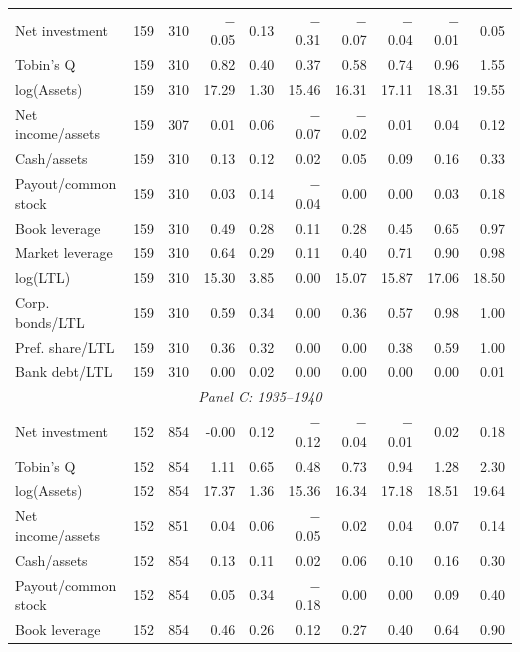 \begin{table}[p]
\begin{threeparttable}
\begin{tabular}{lrrrrrrrrr}
            \midrule
            Net investment & 159 & 310 & $-$0.05 & 0.13 & $-$0.31 & $-$0.07 & $-$0.04 & $-$0.01 & 0.05 \\
            Tobin's Q & 159 & 310 & 0.82 & 0.40 & 0.37 & 0.58 & 0.74 & 0.96 & 1.55 \\
            log(Assets) & 159 & 310 & 17.29 & 1.30 & 15.46 & 16.31 & 17.11 & 18.31 & 19.55 \\
            Net income/assets & 159 & 307 & 0.01 & 0.06 & $-$0.07 & $-$0.02 & 0.01 & 0.04 & 0.12 \\
            Cash/assets & 159 & 310 & 0.13 & 0.12 & 0.02 & 0.05 & 0.09 & 0.16 & 0.33 \\
            Payout/common stock & 159 & 310 & 0.03 & 0.14 & $-$0.04 & 0.00 & 0.00 & 0.03 & 0.18 \\
            Book leverage & 159 & 310 & 0.49 & 0.28 & 0.11 & 0.28 & 0.45 & 0.65 & 0.97 \\
            Market leverage & 159 & 310 & 0.64 & 0.29 & 0.11 & 0.40 & 0.71 & 0.90 & 0.98 \\
            log(LTL) & 159 & 310 & 15.30 & 3.85 & 0.00 & 15.07 & 15.87 & 17.06 & 18.50 \\
            Corp. bonds/LTL & 159 & 310 & 0.59 & 0.34 & 0.00 & 0.36 & 0.57 & 0.98 & 1.00 \\
            Pref. share/LTL & 159 & 310 & 0.36 & 0.32 & 0.00 & 0.00 & 0.38 & 0.59 & 1.00 \\
            Bank debt/LTL & 159 & 310 & 0.00 & 0.02 & 0.00 & 0.00 & 0.00 & 0.00 & 0.01 \\
            \midrule
            \multicolumn{10}{c}{\textit{Panel C: 1935--1940}} \\
            \midrule
            Net investment & 152 & 854 & -0.00 & 0.12 & $-$0.12 & $-$0.04 & $-$0.01 & 0.02 & 0.18 \\
            Tobin's Q & 152 & 854 & 1.11 & 0.65 & 0.48 & 0.73 & 0.94 & 1.28 & 2.30 \\
            log(Assets) & 152 & 854 & 17.37 & 1.36 & 15.36 & 16.34 & 17.18 & 18.51 & 19.64 \\
            Net income/assets & 152 & 851 & 0.04 & 0.06 & $-$0.05 & 0.02 & 0.04 & 0.07 & 0.14 \\
            Cash/assets & 152 & 854 & 0.13 & 0.11 & 0.02 & 0.06 & 0.10 & 0.16 & 0.30 \\
            Payout/common stock & 152 & 854 & 0.05 & 0.34 & $-$0.18 & 0.00 & 0.00 & 0.09 & 0.40 \\
            Book leverage & 152 & 854 & 0.46 & 0.26 & 0.12 & 0.27 & 0.40 & 0.64 & 0.90 \\

\end{tabular}
\end{threeparttable}
\end{table}
